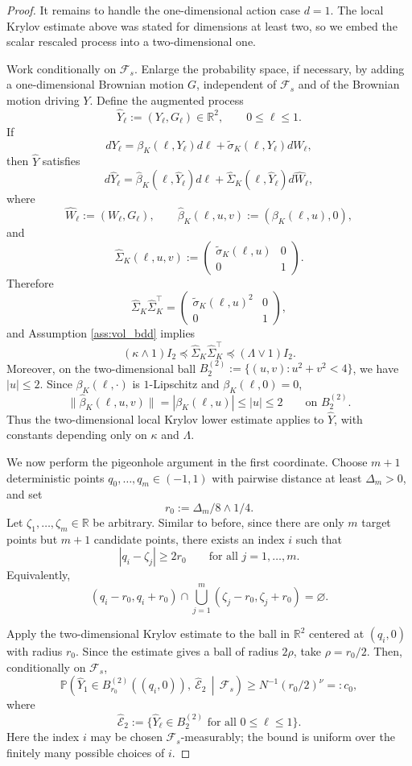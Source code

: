 \documentclass{article}
\newcommand{\1}{\mathbbm{1}}
\numberwithin{equation}{section}
\begin{document}
\begin{proof}
It remains to handle the one-dimensional action case $d=1$. The local
Krylov estimate above was stated for dimensions at least two, so we embed
the scalar rescaled process into a two-dimensional one.

Work conditionally on $\mathcal F_s$. Enlarge the probability space, if
necessary, by adding a one-dimensional Brownian motion $G$, independent of
$\mathcal F_s$ and of the Brownian motion driving $Y$. Define the augmented
process
\[
\widehat Y_\ell := (Y_\ell,G_\ell)\in\mathbb R^2,
\qquad 0\le \ell\le 1.
\]
If
\[
dY_\ell=\beta_K(\ell,Y_\ell)d\ell
+\widetilde\sigma_K(\ell,Y_\ell)dW_\ell,
\]
then $\widehat Y$ satisfies
\[
d\widehat Y_\ell
=
\widehat\beta_K(\ell,\widehat Y_\ell)d\ell
+
\widehat\Sigma_K(\ell,\widehat Y_\ell)d\widehat W_\ell,
\]
where
\[
\widehat W_\ell:=(W_\ell,G_\ell),
\qquad
\widehat\beta_K(\ell,u,v):=(\beta_K(\ell,u),0),
\]
and
\[
\widehat\Sigma_K(\ell,u,v)
:=
\begin{pmatrix}
\widetilde\sigma_K(\ell,u) & 0\\
0 & 1
\end{pmatrix}.
\]
Therefore
\[
\widehat\Sigma_K\widehat\Sigma_K^\top
=
\begin{pmatrix}
\widetilde\sigma_K(\ell,u)^2 & 0\\
0 & 1
\end{pmatrix},
\]
and Assumption \ref{ass:vol_bdd} implies
\[
(\kappa\wedge 1)I_2
\preceq
\widehat\Sigma_K\widehat\Sigma_K^\top
\preceq
(\Lambda\vee 1)I_2 .
\]
Moreover, on the two-dimensional ball $B_2^{(2)}:=\{(u,v):u^2+v^2<4\}$,
we have $|u|\le 2$. Since $\beta_K(\ell,\cdot)$ is $1$-Lipschitz and
$\beta_K(\ell,0)=0$,
\[
\|\widehat\beta_K(\ell,u,v)\|
=
|\beta_K(\ell,u)|
\le |u|
\le 2
\qquad\text{on }B_2^{(2)}.
\]
Thus the two-dimensional local Krylov lower estimate applies to
$\widehat Y$, with constants depending only on $\kappa$ and $\Lambda$.

We now perform the pigeonhole argument in the first coordinate. Choose
$m+1$ deterministic points $q_0,\ldots,q_m\in(-1,1)$ with pairwise distance
at least $\Delta_m>0$, and set
\[
r_0:=\Delta_m/8\wedge 1/4.
\]
Let $\zeta_1,\ldots,\zeta_m\in\mathbb R$ be arbitrary. Similar to before, since there are only $m$ target points but $m+1$ candidate
points, there exists an index $i$ such that
\[
|q_i-\zeta_j|\ge 2r_0
\qquad\text{for all }j=1,\ldots,m.
\]
Equivalently,
\[
(q_i-r_0,q_i+r_0)
\cap
\bigcup_{j=1}^m(\zeta_j-r_0,\zeta_j+r_0)
=
\varnothing .
\]

Apply the two-dimensional Krylov estimate to the ball in $\mathbb R^2$
centered at $(q_i,0)$ with radius $r_0$. Since the estimate gives a ball of
radius $2\rho$, take $\rho=r_0/2$. Then, conditionally on $\mathcal F_s$,
\[
\mathbb P\!\left(
\widehat Y_1\in B_{r_0}^{(2)}((q_i,0)),\
\widehat{\mathcal E}_2
\,\middle|\,\mathcal F_s
\right)
\ge
N^{-1}(r_0/2)^\nu
=:c_0,
\]
where
\[
\widehat{\mathcal E}_2
:=
\{\widehat Y_\ell\in B_2^{(2)}\text{ for all }0\le \ell\le 1\}.
\]
Here the index $i$ may be chosen $\mathcal F_s$-measurably; the bound is
uniform over the finitely many possible choices of $i$.


\end{proof}
\end{document}
